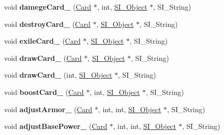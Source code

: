 \begin{DoxyCompactItemize}
\item 
\mbox{\label{class_field_a90d883d3167022443cc2083fbccfcb0f}} 
void {\bfseries damege\+Card\+\_\+} (\hyperlink{class_card}{Card} $\ast$, int, \hyperlink{class_s_i___object}{S\+I\+\_\+\+Object} $\ast$, S\+I\+\_\+\+String)
\item 
\mbox{\label{class_field_a6f009785e69ed65e5d7e04bf0ace4507}} 
void {\bfseries destroy\+Card\+\_\+} (\hyperlink{class_card}{Card} $\ast$, \hyperlink{class_s_i___object}{S\+I\+\_\+\+Object} $\ast$, S\+I\+\_\+\+String)
\item 
\mbox{\label{class_field_a75989332dc806ff77e30ad9b59b6aded}} 
void {\bfseries exile\+Card\+\_\+} (\hyperlink{class_card}{Card} $\ast$, \hyperlink{class_s_i___object}{S\+I\+\_\+\+Object} $\ast$, S\+I\+\_\+\+String)
\item 
\mbox{\label{class_field_a58fa7fd837297cca03acd75149a28d27}} 
void {\bfseries draw\+Card\+\_\+} (\hyperlink{class_card}{Card} $\ast$, \hyperlink{class_s_i___object}{S\+I\+\_\+\+Object} $\ast$, S\+I\+\_\+\+String)
\item 
\mbox{\label{class_field_a5d2ecc775e14bb17e008a74648a0fab1}} 
void {\bfseries draw\+Card\+\_\+} (int, \hyperlink{class_s_i___object}{S\+I\+\_\+\+Object} $\ast$, S\+I\+\_\+\+String)
\item 
\mbox{\label{class_field_a4465a0e124e100e495b9956956031c35}} 
void {\bfseries boost\+Card\+\_\+} (\hyperlink{class_card}{Card} $\ast$, int, \hyperlink{class_s_i___object}{S\+I\+\_\+\+Object} $\ast$, S\+I\+\_\+\+String)
\item 
\mbox{\label{class_field_abe02c73875f460a482217c19ed9ed880}} 
void {\bfseries adjust\+Armor\+\_\+} (\hyperlink{class_card}{Card} $\ast$, int, int, \hyperlink{class_s_i___object}{S\+I\+\_\+\+Object} $\ast$, S\+I\+\_\+\+String)
\item 
\mbox{\label{class_field_aa295489317a238a7643f319144dfe659}} 
void {\bfseries adjust\+Base\+Power\+\_\+} (\hyperlink{class_card}{Card} $\ast$, int, int, \hyperlink{class_s_i___object}{S\+I\+\_\+\+Object} $\ast$, S\+I\+\_\+\+String)
\item 

\end{DoxyCompactItemize}
